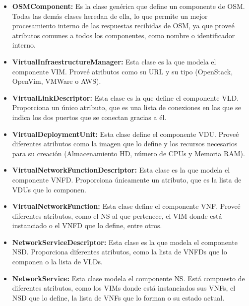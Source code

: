 \begin{itemize}
	\item \textbf{OSMComponent:} Es la clase genérica que define un componente de \ac{OSM}. Todas las demás clases heredan de ella, lo que permite un mejor procesamiento interno de las respuestas recibidas de \ac{OSM}, ya que proveé atributos comunes a todos los componentes, como nombre o identificador interno.
	
	\item \textbf{VirtualInfraestructureManager:} Esta clase es la que modela el componente \ac{VIM}. Proveé atributos como su \ac{URL} y su tipo (OpenStack, OpenVim, VMWare o \ac{AWS}).
	
	\item \textbf{VirtualLinkDescriptor:} Esta clase es la que define el componente \ac{VLD}. Proporciona un único atributo, que es una lista de conexiones en las que se indica los dos puertos que se conectan gracias a él.
	
	\item \textbf{VirtualDeploymentUnit:} Esta clase define el componente \ac{VDU}. Proveé diferentes atributos como la imagen que lo define y los recursos necesarios para su creación (Almacenamiento HD, número de CPUs y Memoria RAM).
	
	\item \textbf{VirtualNetworkFunctionDescriptor:} Esta clase es la que modela el componente \ac{VNFD}. Proporciona únicamente un atributo, que es la lista de \acp{VDU} que lo componen.
		
	\item \textbf{VirtualNetworkFunction:} Esta clase define el componente \ac{VNF}. Proveé diferentes atributos, como el \ac{NS} al que pertenece, el \ac{VIM} donde está instanciado o el \ac{VNFD} que lo define, entre otros.
	
	\item \textbf{NetworkServiceDescriptor:} Esta clase es la que modela el componente \ac{NSD}. Proporciona diferentes atributos, como la lista de \acp{VNFD} que lo componen o la lista de \acp{VLD}.
	
	\item \textbf{NetworkService:} Esta clase modela el componente \ac{NS}. Está compuesto de diferentes atributos, como los \acp{VIM} donde está instanciados sus \acp{VNF}, el \ac{NSD} que lo define, la lista de \acp{VNF} que lo forman o su estado actual.
	
\end{itemize}


